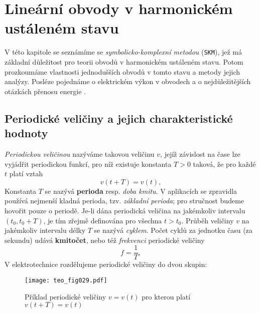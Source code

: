 \chapter[Harmonické obvody]{Lineární obvody v harmonickém ustáleném stavu}
\minitoc

  V této kapitole se seznámíme se \emph{symbolicko-komplexní metodou} (\texttt{SKM}), jež má
  základní důležitost pro teorii obvodů v harmonickém ustáleném stavu. Potom prozkoumáme vlastnosti
  jednodušších obvodů v tomto stavu a metody jejich analýzy. Posléze pojednáme o elektrickém výkon
  v obvodech a o nejdůležitějších otázkách přenosu energie \cite[s.~60]{Mayer1975}.
  
  \section{Periodické veličiny a jejich charakteristické hodnoty}
    \emph{Periodickou veličinou} nazýváme takovou veličinu $v$, jejíž závislost na čase lze
    vyjádřit periodickou funkcí, pro níž existuje konstanta $T>0$ taková, že pro každé $t$ platí
    vztah
    \begin{equation}\label{TEO:eq_harm01}
      v(t+T) = v(t),    
    \end{equation}  
    Konstanta $T$ se nazývá \textbf{perioda} resp. \emph{doba kmitu}. V aplikacích se zpravidla
    používá nejmenší kladná perioda, tzv. \emph{základní perioda}; pro stručnost budeme hovořit
    pouze o periodě. Je-li dána periodická veličina na jakémkoliv intervalu $(t_0, t_0+T)$, je tím
    zřejmě definována pro všechna $t>t_0$. Průběh veličiny $v$ na jakémkoliv intervalu délky $T$ se
    nazývá \emph{cyklem}. Počet cyklů za jednotku času (za sekundu) udává \textbf{kmitočet}, nebo
    též \emph{frekvenci} periodické veličiny
    \begin{equation}\label{TEO:eq_harm02}
      f = \frac{1}{T},
    \end{equation}
    V elektrotechnice rozdělujeme periodické veličiny do dvou skupin:
    \begin{figure}[ht!] %
       \centering
       \texttt{[image: teo\_fig029.pdf]}
       \caption{Příklad periodické veličiny $v=v(t)$ pro kterou platí $v(t+T)=v(t)$}
       \label{teo:fig029}
    \end{figure}

